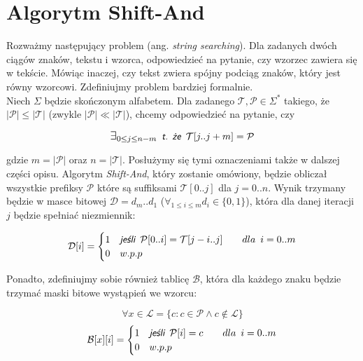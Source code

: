 \section{Algorytm Shift-And}

\label{sec:shiftand}

Rozważmy następujący problem (ang. \textit{string searching}). Dla zadanych dwóch ciągów
znaków, tekstu i wzorca, odpowiedzieć na pytanie, czy wzorzec zawiera się w tekście.
Mówiąc inaczej, czy tekst zwiera spójny podciąg znaków, który jest równy wzorcowi.
Zdefiniujmy problem bardziej formalnie. \\

Niech $\Sigma$ będzie skończonym alfabetem. Dla zadanego $\mathcal{T},\mathcal{P} \in \Sigma^*$
takiego, że $|\mathcal{P}| \le |\mathcal{T}|$ (zwykle $|\mathcal{P}| \ll |\mathcal{T}|$), chcemy
odpowiedzieć na pytanie, czy

\begin{equation}
    \label{eq:stringSearchingDefinition}
    \mathlarger{\exists_{0 \leq j \leq n - m}} \enspace
    \textit{\textsf{t. że}} \enspace \mathcal{T}[j..j+m] = \mathcal{P}
\end{equation}

gdzie $m = |\mathcal{P}|$ oraz $n = |\mathcal{T}|$. Posłużymy się tymi oznaczeniami także w dalszej
części opisu. Algorytm \textit{Shift-And}, który zostanie omówiony, będzie obliczał wszystkie
prefiksy $\mathcal{P}$ które są suffiksami $\mathcal{T}[0..j]$ dla $j=0..n$. Wynik trzymany będzie
w masce bitowej $\mathcal{D} = d_m..d_1$ ($\forall_{1 \leq i \leq m} d_{i} \in \{0, 1\} $), która dla danej iteracji $j$ będzie spełniać niezmiennik:

\begin{equation}
 \label{eq:invariant}
 \mathcal{D}[i] =
  \begin{cases}
      1 & \textit{\textsf{jeśli}} \enspace \mathcal{P}[0..i] = \mathcal{T}[j-i..j]
            \quad\quad dla \enspace i=0..m \\
      0 & w.p.p
  \end{cases}
\end{equation}

Ponadto, zdefiniujmy sobie również tablicę $\mathcal{B}$, która dla każdego znaku będzie
trzymać maski bitowe wystąpień we wzorcu:

$$
    \forall x \in \mathcal{L} = \{c: c \in \mathcal{P} \wedge c \notin \mathcal{L}\}
$$
$$
    \mathcal{B}[x][i] =
     \begin{cases}
         1 & \textit{\textsf{jeśli}} \enspace \mathcal{P}[i] = c \quad\quad dla \enspace i=0..m \\
         0 & w.p.p
     \end{cases}
$$

